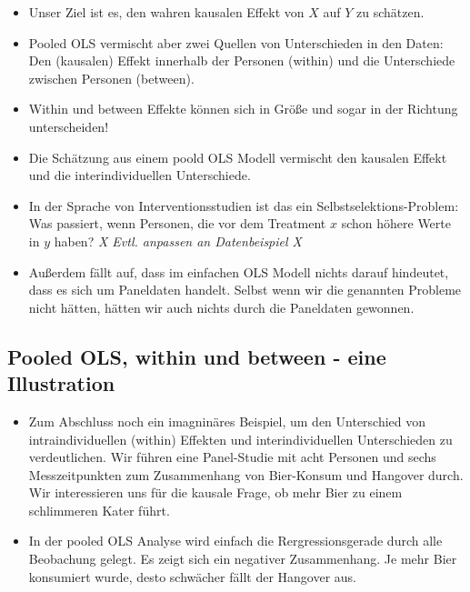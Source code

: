 \documentclass[]{book}
\providecommand{\tightlist}{%
  \setlength{\itemsep}{0pt}\setlength{\parskip}{0pt}}
\begin{document}
\begin{itemize}
\tightlist
\item
  Unser Ziel ist es, den wahren kausalen Effekt von \(X\) auf \(Y\) zu schätzen.
\item
  Pooled OLS vermischt aber zwei Quellen von Unterschieden in den Daten: Den (kausalen) Effekt innerhalb der Personen (within) und die Unterschiede zwischen Personen (between).
\item
  Within und between Effekte können sich in Größe und sogar in der Richtung unterscheiden!
\item
  Die Schätzung aus einem poold OLS Modell vermischt den kausalen Effekt und die interindividuellen Unterschiede.
\item
  In der Sprache von Interventionsstudien ist das ein Selbstselektions-Problem: Was passiert, wenn Personen, die vor dem Treatment \(x\) schon höhere Werte in \(y\) haben? \emph{X Evtl. anpassen an Datenbeispiel X}
\item
  Außerdem fällt auf, dass im einfachen OLS Modell nichts darauf hindeutet, dass es sich um Paneldaten handelt. Selbst wenn wir die genannten Probleme nicht hätten, hätten wir auch nichts durch die Paneldaten gewonnen.
\end{itemize}

\hypertarget{pooled-ols-within-und-between---eine-illustration}{%
\subsection*{Pooled OLS, within und between - eine Illustration}\label{pooled-ols-within-und-between---eine-illustration}}

\begin{itemize}
\item
  Zum Abschluss noch ein imagninäres Beispiel, um den Unterschied von intraindividuellen (within) Effekten und interindividuellen Unterschieden zu verdeutlichen. Wir führen eine Panel-Studie mit acht Personen und sechs Messzeitpunkten zum Zusammenhang von Bier-Konsum und Hangover durch. Wir interessieren uns für die kausale Frage, ob mehr Bier zu einem schlimmeren Kater führt.
\item
  In der pooled OLS Analyse wird einfach die Rergressionsgerade durch alle Beobachung gelegt. Es zeigt sich ein negativer Zusammenhang. Je mehr Bier konsumiert wurde, desto schwächer fällt der Hangover aus.
\end{itemize}
\end{document}
